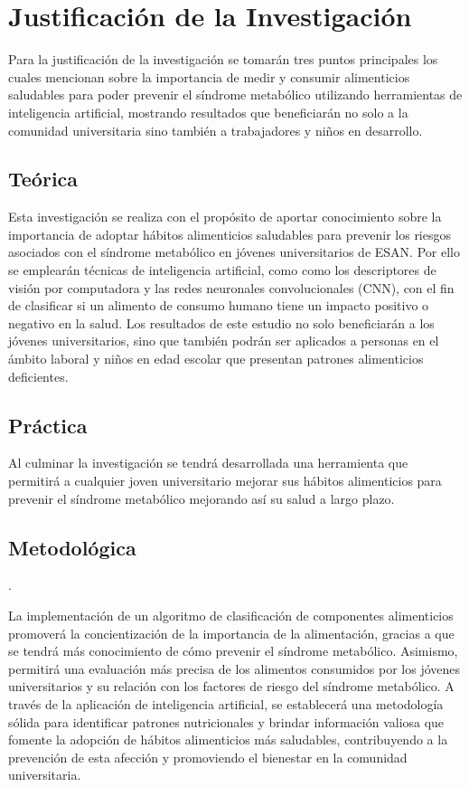 \section{Justificación de la Investigación}

Para la justificación de la investigación se tomarán tres puntos principales los cuales mencionan sobre la importancia de medir y consumir alimenticios saludables para poder prevenir el síndrome metabólico utilizando herramientas de inteligencia artificial, mostrando resultados que beneficiarán no solo a la comunidad universitaria sino también a trabajadores y niños en desarrollo.

\subsection{Teórica}

Esta investigación se realiza con el propósito de aportar conocimiento sobre la importancia de adoptar hábitos alimenticios saludables para prevenir los riesgos asociados con el síndrome metabólico en jóvenes universitarios de ESAN. Por ello se emplearán técnicas de inteligencia artificial, como como los descriptores de visión por computadora y las redes neuronales convolucionales (CNN), con el fin de clasificar si un alimento de consumo humano tiene un impacto positivo o negativo en la salud. Los resultados de este estudio no solo beneficiarán a los jóvenes universitarios, sino que también podrán ser aplicados a personas en el ámbito laboral y niños en edad escolar que presentan patrones alimenticios deficientes.

\subsection{Práctica}

Al culminar la investigación se tendrá desarrollada una herramienta que permitirá a cualquier joven universitario mejorar sus hábitos alimenticios para prevenir el síndrome metabólico mejorando así su salud a largo plazo.

\subsection{Metodológica}. 

La implementación de un algoritmo de clasificación de componentes alimenticios promoverá la concientización de la importancia de la alimentación, gracias a que se tendrá más conocimiento de cómo prevenir el síndrome metabólico. Asimismo, permitirá una evaluación más precisa de los alimentos consumidos por los jóvenes universitarios y su relación con los factores de riesgo del síndrome metabólico. A través de la aplicación de inteligencia artificial, se establecerá una metodología sólida para identificar patrones nutricionales y brindar información valiosa que fomente la adopción de hábitos alimenticios más saludables, contribuyendo a la prevención de esta afección y promoviendo el bienestar en la comunidad universitaria.


